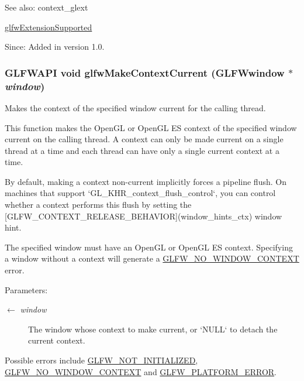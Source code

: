 \begin{Desc}
\item[See also:]context\_\-glext 

\hyperlink{group__context_g9a28c712d35f9e43534e1d03b051c04c}{glfwExtensionSupported}\end{Desc}
\begin{Desc}
\item[Since:]Added in version 1.0. \end{Desc}
\hypertarget{group__context_gfd76c93e15ec8b0b90506a9936a46185}{
\subsubsection[glfwMakeContextCurrent]{\setlength{\rightskip}{0pt plus 5cm}GLFWAPI void glfwMakeContextCurrent ({\bf GLFWwindow} $\ast$ {\em window})}}
\label{group__context_gfd76c93e15ec8b0b90506a9936a46185}


Makes the context of the specified window current for the calling thread. 

This function makes the OpenGL or OpenGL ES context of the specified window current on the calling thread. A context can only be made current on a single thread at a time and each thread can have only a single current context at a time.

By default, making a context non-current implicitly forces a pipeline flush. On machines that support `GL\_\-KHR\_\-context\_\-flush\_\-control`, you can control whether a context performs this flush by setting the \mbox{[}GLFW\_\-CONTEXT\_\-RELEASE\_\-BEHAVIOR\mbox{]}(window\_\-hints\_\-ctx) window hint.

The specified window must have an OpenGL or OpenGL ES context. Specifying a window without a context will generate a \hyperlink{group__errors_gcff24d2757da752ae4c80bf452356487}{GLFW\_\-NO\_\-WINDOW\_\-CONTEXT} error.

\begin{Desc}
\item[Parameters:]
\begin{description}
\item[\mbox{$\leftarrow$} {\em window}]The window whose context to make current, or `NULL` to detach the current context.\end{description}
\end{Desc}
Possible errors include \hyperlink{group__errors_g2374ee02c177f12e1fa76ff3ed15e14a}{GLFW\_\-NOT\_\-INITIALIZED}, \hyperlink{group__errors_gcff24d2757da752ae4c80bf452356487}{GLFW\_\-NO\_\-WINDOW\_\-CONTEXT} and \hyperlink{group__errors_gd44162d78100ea5e87cdd38426b8c7a1}{GLFW\_\-PLATFORM\_\-ERROR}.

